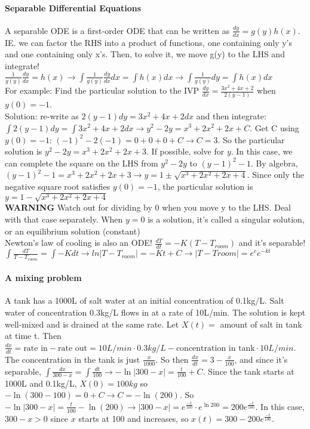 \documentclass[10pt,letter]{article}
\begin{document}
\paragraph{Separable Differential Equations} A separable ODE is a first-order ODE that can be written as $\frac{dy}{dx}=g(y)h(x)$. IE. we can factor the RHS into a product of functions, one containing only y's and one containing only x's. Then, to solve it, we move g(y) to the LHS and integrate! $\frac{1}{g(y)}\frac{dy}{dx}=h(x)\rightarrow \int\frac{1}{g(y)}\frac{dy}{dx}dx=\int h(x)dx\rightarrow \int\frac{1}{g(y)}dy = \int h(x)dx$\\ 
For example: Find the particular solution to the IVP $\frac{dy}{dx}=\frac{3x^2+4x+2}{2(y-1)}$ when $y(0)=-1$. \\
Solution: re-write as $2(y-1)dy = 3x^2+4x+2dx$ and then integrate: $\int 2(y-1)dy = \int 3x^2 + 4x+2dx\rightarrow y^2-2y=x^3+2x^2+2x+C$. Get C using $y(0)=-1$: $(-1)^2-2(-1)=0+0+0+C\rightarrow C = 3$. So the particular solution is $y^2-2y=x^3+2x^2+2x+3$. If possible, solve for $y$. In this case, we can complete the square on the LHS from $y^2-2y$ to $(y-1)^2-1$. By algebra, $(y-1)^2-1=x^3+2x^2+2x+3\rightarrow y = 1\pm\sqrt{x^3+2x^2+2x+4}$. Since only the negative square root satisfies $y(0)=-1$, the particular solution is $y=1-\sqrt{x^3+2x^2+2x+4}$ \\ 
\textbf{WARNING} Watch out for dividing by 0 when you move y to the LHS. Deal with that case separately. When $y=0$ is a solution, it's called a singular solution, or an equilibrium solution (constant)\\
Newton's law of cooling is also an ODE! $\frac{dT}{dt}  = -K(T-T_{room})$ and it's separable! $\int\frac{dT}{T-T_{room}}=\int-Kdt\rightarrow ln|T-T_{room}| = -Kt +C\rightarrow |T-Troom| = e^ce^{-kt}$


\paragraph{A mixing problem} A tank has a 1000L of salt water at an initial concentration of 0.1kg/L. Salt water of concentration 0.3kg/L flows in at a rate of 10L/min. The solution is kept well-mixed and is drained at the same rate. Let $X(t)=$ amount of salt in tank at time t. Then $\frac{dx}{dt}=\text{rate in}- \text{rate out} = 10L/min \cdot 0.3kg/L - \text{concentration in tank} \cdot 10L/min$. The concentration in the tank is just $\frac{x}{1000}$. So then $\frac{dx}{dt}=3-\frac{x}{100}$, and since it's separable, $\int\frac{dx}{300-x}=\int\frac{dt}{100}\rightarrow -\ln|300-x|=\frac{t}{100}+C$. Since the tank starts at 1000L and 0.1kg/L, $X(0)=100kg$ so $-\ln(300-100) = 0 + C\rightarrow C = -\ln(200)$. So $-\ln|300-x|=\frac{t}{100}-\ln(200)\rightarrow |300-x|=e^{\frac{-t}{100}}\cdot e^{\ln200}=200e^{\frac{-t}{100}}$. In this case, $300-x>0$ since $x$ starts at 100 and increases, so $x(t) = 300 - 200e^{\frac{-t}{100}}$. 
\end{document}

